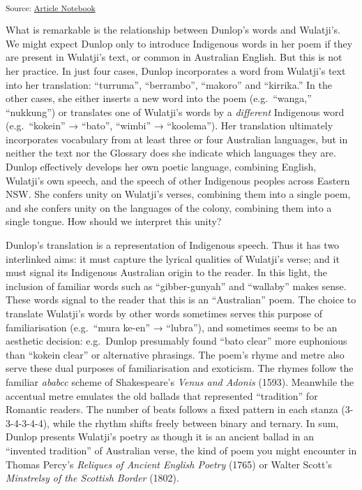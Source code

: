 \documentclass[
  Crown,
  times,
  sageh]{sagej}
\begin{document}
\textsubscript{Source:
\href{https://michaelgfalk.github.io/harpur-dunlop-wulatji/harpur-dunlop-wulatji.qmd.html}{Article
Notebook}}

What is remarkable is the relationship between Dunlop's words and
Wulatji's. We might expect Dunlop only to introduce Indigenous words in
her poem if they are present in Wulatji's text, or common in Australian
English. But this is not her practice. In just four cases, Dunlop
incorporates a word from Wulatji's text into her translation:
``turruma'', ``berrambo'', ``makoro'' and ``kirrika.'' In the other
cases, she either inserts a new word into the poem (e.g.~``wanga,''
``nukkung'') or translates one of Wulatji's words by a \emph{different}
Indigenous word (e.g.~``kokein'' → ``bato'', ``wimbi'' → ``koolema'').
Her translation ultimately incorporates vocabulary from at least three
or four Australian languages, but in neither the text nor the Glossary
does she indicate which languages they are. Dunlop effectively develops
her own poetic language, combining English, Wulatji's own speech, and
the speech of other Indigenous peoples across Eastern NSW. She confers
unity on Wulatji's verses, combining them into a single poem, and she
confers unity on the languages of the colony, combining them into a
single tongue. How should we interpret this unity?

Dunlop's translation is a representation of Indigenous speech. Thus it
has two interlinked aims: it must capture the lyrical qualities of
Wulatji's verse; and it must signal its Indigenous Australian origin to
the reader. In this light, the inclusion of familiar words such as
``gibber-gunyah'' and ``wallaby'' makes sense. These words signal to the
reader that this is an ``Australian'' poem. The choice to translate
Wulatji's words by other words sometimes serves this purpose of
familiarisation (e.g.~``mura ke-en'' → ``lubra''), and sometimes seems
to be an aesthetic decision: e.g.~Dunlop presumably found ``bato clear''
more euphonious than ``kokein clear'' or alternative phrasings. The
poem's rhyme and metre also serve these dual purposes of familiarisation
and exoticism. The rhymes follow the familiar \emph{ababcc} scheme of
Shakespeare's \emph{Venus and Adonis} (1593). Meanwhile the accentual
metre emulates the old ballads that represented ``tradition'' for
Romantic readers. The number of beats follows a fixed pattern in each
stanza (3-3-4-3-4-4), while the rhythm shifts freely between binary and
ternary. In sum, Dunlop presents Wulatji's poetry as though it is an
ancient ballad in an ``invented tradition'' of Australian verse, the
kind of poem you might encounter in Thomas Percy's \emph{Reliques of
Ancient English Poetry} (1765) or Walter Scott's \emph{Minstrelsy of the
Scottish Border} (1802).
\end{document}
